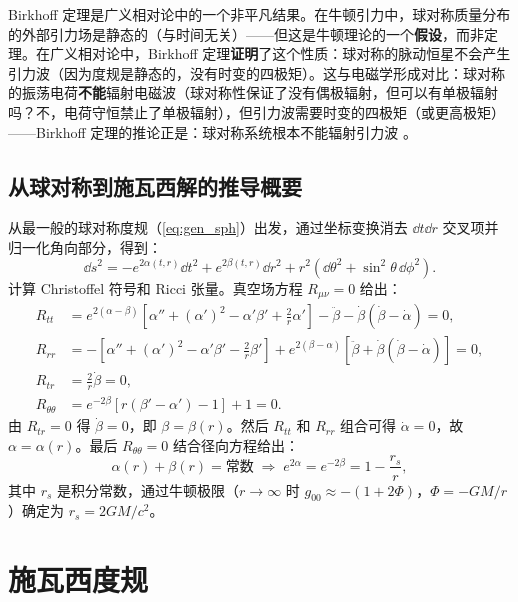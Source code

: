 \begin{note}
Birkhoff 定理是广义相对论中的一个非平凡结果。在牛顿引力中，球对称质量分布的外部引力场是静态的（与时间无关）——但这是牛顿理论的一个\textbf{假设}，而非定理。在广义相对论中，Birkhoff 定理\textbf{证明}了这个性质：球对称的脉动恒星不会产生引力波（因为度规是静态的，没有时变的四极矩）。这与电磁学形成对比：球对称的振荡电荷\textbf{不能}辐射电磁波（球对称性保证了没有偶极辐射，但可以有单极辐射吗？不，电荷守恒禁止了单极辐射），但引力波需要时变的四极矩（或更高极矩）——Birkhoff 定理的推论正是：球对称系统根本不能辐射引力波 \cite{Wald1984,Carroll1997}。
\end{note}

\subsection{从球对称到施瓦西解的推导概要}

从最一般的球对称度规（\ref{eq:gen_sph}）出发，通过坐标变换消去 $\dd t\dd r$ 交叉项并归一化角向部分，得到：
\begin{equation}
    \dd s^2 = -e^{2\alpha(t,r)} \dd t^2 + e^{2\beta(t,r)} \dd r^2 + r^2 (\dd\theta^2 + \sin^2\theta \, \dd\phi^2).
\end{equation}
计算 Christoffel 符号和 Ricci 张量。真空场方程 $R_{\mu\nu}=0$ 给出：
\begin{align}
    R_{tt} &= e^{2(\alpha-\beta)}\left[\alpha'' + (\alpha')^2 - \alpha'\beta' + \frac{2}{r}\alpha'\right] - \ddot\beta - \dot\beta(\dot\beta-\dot\alpha) = 0, \\
    R_{rr} &= -\left[\alpha'' + (\alpha')^2 - \alpha'\beta' - \frac{2}{r}\beta'\right] + e^{2(\beta-\alpha)}\left[\ddot\beta + \dot\beta(\dot\beta-\dot\alpha)\right] = 0, \\
    R_{tr} &= \frac{2}{r}\dot\beta = 0, \\
    R_{\theta\theta} &= e^{-2\beta}\left[r(\beta'-\alpha')-1\right] + 1 = 0.
\end{align}
由 $R_{tr}=0$ 得 $\dot\beta=0$，即 $\beta=\beta(r)$。然后 $R_{tt}$ 和 $R_{rr}$ 组合可得 $\dot\alpha=0$，故 $\alpha=\alpha(r)$。最后 $R_{\theta\theta}=0$ 结合径向方程给出：
\begin{equation}
    \alpha(r) + \beta(r) = \text{常数} \;\Longrightarrow\; e^{2\alpha} = e^{-2\beta} = 1 - \frac{r_s}{r},
\end{equation}
其中 $r_s$ 是积分常数，通过牛顿极限（$r\to\infty$ 时 $g_{00} \approx -(1 + 2\Phi)$，$\Phi = -GM/r$）确定为 $r_s = 2GM/c^2$。

\section{施瓦西度规}
\label{sec:schwarz_metric}

